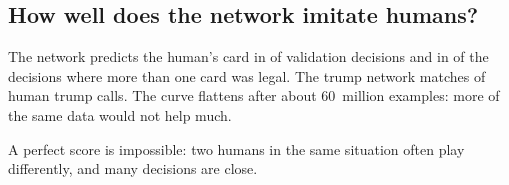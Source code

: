 \documentclass[10pt,a4paper]{article}
\begin{document}
\subsection{How well does the network imitate humans?}
\begin{minipage}[t]{0.5\textwidth}
\vspace{0pt}
\end{minipage}\hfill
\begin{minipage}[t]{0.46\textwidth}
\vspace{4pt}
The network predicts the human's card in \CardAcc{} of validation decisions and in \CardAccChoice{} of the decisions
where more than one card was legal. The trump network matches \TrumpAcc{} of human trump calls.
The curve flattens after about 60~million examples: more of the same data would not help much.

A perfect score is impossible: two humans in the same situation often play differently, and many decisions are close.
\end{minipage}
\end{document}
